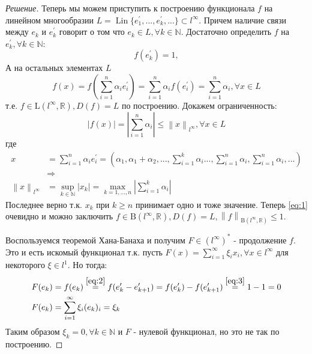 \documentclass[12pt,a4paper]{article}
\theoremstyle{definition}
\newenvironment{solution}
{\renewcommand\qedsymbol{$\blacksquare$}\begin{proof}[Решение]}
{\end{proof}}
\newcommand{\Real}{\mathbb{R}}
\newcommand{\Natural}{\mathbb{N}}
\newcommand{\norm}[1]{\left\lVert#1\right\rVert}
\newcommand{\conj}[1]{\left(#1\right)^*}
\newcommand{\bounded}[2]{\textrm{B}(#1, #2)}
\newcommand{\linear}[2]{\textrm{L}(#1, #2)}
\DeclareMathOperator{\Lin}{Lin}
\begin{document}
\begin{solution}
		Теперь мы можем приступить к построению функционала $f$ на линейном многообразии $L = \Lin\{e_1^\prime, ..., e_k^\prime, ...\} \subset l^\infty$. Причем наличие связи между $e_k$ и $e_k^\prime$ говорит о том что $e_k \in L, \forall k \in \Natural$. Достаточно определить $f$ на $e_k^\prime, \forall k \in \Natural$:
		\begin{equation}\label{eq:3}
			f(e_k^\prime) = 1 ,
		\end{equation}
		А на остальных элементах $L$
		$$f(x) = f\left(\sum_{i=1}^{n}{\alpha_i e_i^\prime}\right) = \sum_{i=1}^{n}{\alpha_i f(e_i^\prime)} = \sum_{i=1}^{n}{\alpha_i}, \forall x \in L$$
		т.е. $f \in \linear{l^\infty}{\Real}, D(f) = L$ по построению. Докажем ограниченность:
		\begin{equation}\label{eq:1}
			|f(x)| = \left|\sum_{i=1}^{n}{\alpha_i}\right| \leq \norm{x}_{l^\infty}, \forall x \in L
		\end{equation}
		где 
		\begin{align*}
			x &= \sum\limits_{i=1}^{n}{\alpha_i e_i^\prime} =
			\left(\alpha_1, \alpha_1 + \alpha_2, ..., \sum_{i=1}^{k}{\alpha_i} ..., \sum_{i=1}^{n}{\alpha_i}, \sum_{i=1}^{n}{\alpha_i}, ... \right) \\
			&\Rightarrow \\
			\norm{x}_{l^\infty} &= \sup_{k \in \Natural}{|x_k|} = \max_{k = 1, ..., n}{\left| \sum_{i=1}^{k}{\alpha_i} \right|}
		\end{align*}
		Последнее верно т.к. $x_k$ при $k \geq n$ принимает одно и тоже значение. Теперь \eqref{eq:1} очевидно и можно заключить $f \in \bounded{l^\infty}{\Real}, D(f) = L, \norm{f}_{\bounded{l^\infty}{\Real}} \leq 1$. 
		
		Воспользуемся теоремой Хана-Банаха и получим $F \in \conj{l^\infty}$ - продолжение $f$. Это и есть искомый функционал т.к. пусть $F(x) = \sum\limits_{i=1}^{\infty}{\xi_i x_i}, \forall x \in l^\infty$ для некоторого $\xi \in l^1$. Но тогда:
		\begin{align*}
			F(e_k) &= f(e_k) \overset{\eqref{eq:2}}{=} f( e_{k}^\prime - e_{k+1}^\prime) = f(e_{k} ^\prime) - f(e_{k+1}^\prime)  \overset{\eqref{eq:3}}{=} 1 - 1 = 0 \\
			F(e_k) &= \sum\limits_{i=1}^{\infty}{\xi_i (e_k)_{i}} = \xi_k
		\end{align*}
		Таким образом $\xi_k = 0, \forall k \in \Natural$ и $F$ - нулевой функционал, но это не так по построению. 
	\end{solution}

	\newpage
	
\end{document}
